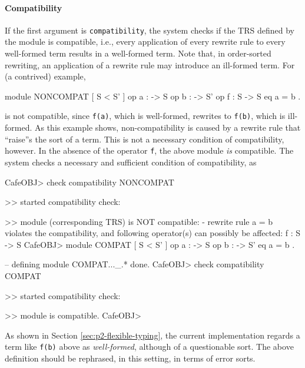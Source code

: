 \documentclass[a4paper]{memoir}
\begin{document}
\paragraph{Compatibility}

If the first argument is \verb|compatibility|, the system checks
if the TRS defined by the module is compatible, i.e.,
every application of every rewrite rule to every well-formed term
results in a well-formed term. Note that, in order-sorted
rewriting, an application of a rewrite rule may introduce
an ill-formed term. For (a contrived) example,
\begin{vvtm}
\begin{ccode}
  module NONCOMPAT {
    [ S < S' ]
    op a : -> S
    op b : -> S'
    op f : S -> S
    eq a = b .
  }
\end{ccode}
\end{vvtm}
is not compatible, since \verb|f(a)|, which is well-formed, rewrites to
\verb|f(b)|, which is ill-formed. As this example shows, non-compatibility
is caused by a rewrite rule that ``raise''s the sort of a term. This is
not a necessary condition of compatibility, however. In the absence of
the operator \verb|f|, the above module {\em is} compatible.
The system checks a necessary and sufficient condition of compatibility,
as
\begin{vvtm}
\begin{ccode}
  CafeOBJ> check compatibility NONCOMPAT

  >> started compatibility check:

  >> module (corresponding TRS) is NOT compatible:
  - rewrite rule
      a = b
    violates the compatibility,
    and following operator(s) can possibly be affected:
      f : S -> S
  CafeOBJ> module COMPAT {
      [ S < S' ]
      op a : -> S
      op b : -> S'
      eq a = b .
  }

  -- defining module COMPAT..._.* done.
  CafeOBJ> check compatibility COMPAT

  >> started compatibility check:

  >> module is compatible.
  CafeOBJ>
\end{ccode}
\end{vvtm}

\begin{warning}
  As shown in Section \ref{sec:p2-flexible-typing}, the current
  implementation regards
  a term like \verb|f(b)| above as {\em well-formed}, although of
  a questionable sort. The above definition should be rephrased, in this
  setting, in terms of error sorts.
\end{warning}
\end{document}
